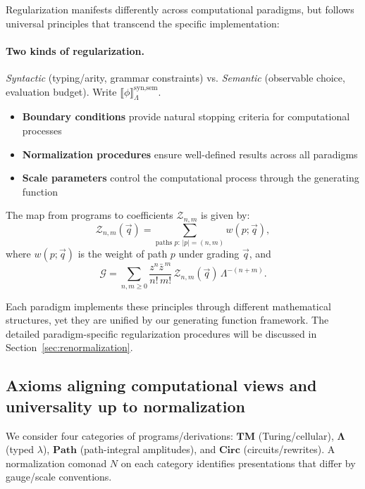 Regularization manifests differently across computational paradigms, but follows universal principles that transcend the specific implementation:

\paragraph{Two kinds of regularization.}
\textit{Syntactic} (typing/arity, grammar constraints) vs. \textit{Semantic} (observable choice, evaluation budget). Write $\llbracket\phi\rrbracket_{\Lambda}^{\text{syn},\text{sem}}$.

\begin{itemize}
\item \textbf{Boundary conditions} provide natural stopping criteria for computational processes
\item \textbf{Normalization procedures} ensure well-defined results across all paradigms
\item \textbf{Scale parameters} control the computational process through the generating function
\end{itemize}

\begin{definition}
\label{def:program-coefficient-map}
The map from programs to coefficients $\mathcal{Z}_{n,m}$ is given by:
\[
\mathcal{Z}_{n,m}(\vec{q}) = \sum_{\text{paths }p:\,|p|=(n,m)} w(p;\vec{q}),
\]
where $w(p;\vec{q})$ is the weight of path $p$ under grading $\vec{q}$, and
\[
\mathcal{G} = \sum_{n,m\ge0}\frac{z^n\bar{z}^{\,m}}{n!\,m!}\,\mathcal{Z}_{n,m}(\vec{q})\,\Lambda^{-(n+m)}.
\]
\end{definition}

Each paradigm implements these principles through different mathematical structures, yet they are unified by our generating function framework. The detailed paradigm-specific regularization procedures will be discussed in Section~\ref{sec:renormalization}.

\subsection{Axioms aligning computational views and universality up to normalization}

We consider four categories of programs/derivations:
$\mathbf{TM}$ (Turing/cellular), $\mathbf{\Lambda}$ (typed $\lambda$),
$\mathbf{Path}$ (path-integral amplitudes), and $\mathbf{Circ}$ (circuits/rewrites).
A normalization comonad $N$ on each category identifies presentations that differ by
gauge/scale conventions.


